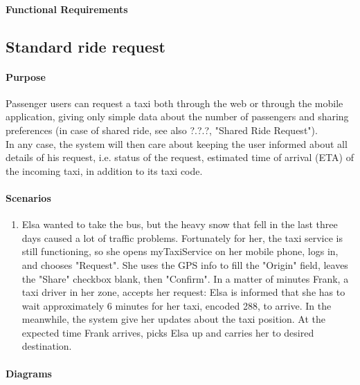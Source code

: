\paragraph{Functional Requirements}

\subsection{Standard ride request}

\paragraph{Purpose}

Passenger users can request a taxi both through the web or through the mobile application, giving only simple data about the number of passengers and sharing preferences (in case of shared ride, see also ?.?.?, "Shared Ride Request").\\
In any case, the system will then care about keeping the user informed about all details of his request, i.e. status of the request, estimated time of arrival (ETA) of the incoming taxi, in addition to its taxi code.

\paragraph{Scenarios}
\begin{enumerate}
	\item Elsa wanted to take the bus, but the heavy snow that fell in the last three days caused a lot of traffic problems. Fortunately for her, the taxi service is still functioning, so she opens myTaxiService on her mobile phone, logs in, and chooses "Request".
	She uses the GPS info to fill the "Origin" field, leaves the "Share" checkbox blank, then "Confirm". In a matter of minutes Frank, a taxi driver in her zone, accepts her request: Elsa is informed that she has to wait approximately 6 minutes for her taxi, encoded 288, to arrive. In the meanwhile, the system give her updates about the taxi position. At the expected time Frank arrives, picks Elsa up and carries her to desired destination.
\end{enumerate}

\paragraph{Diagrams}

